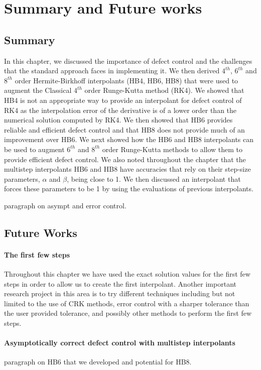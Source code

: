 \section{Summary and Future works}
\subsection{Summary}
In this chapter, we discussed the importance of defect control and the challenges that the standard approach faces in implementing it. We then derived $4^{th}$, $6^{th}$ and $8^{th}$ order Hermite-Birkhoff interpolants (HB4, HB6, HB8) that were used to augment the Classical $4^{th}$ order Runge-Kutta method (RK4). We showed that HB4 is not an appropriate way to provide an interpolant for defect control of RK4 as the interpolation error of the derivative is of a lower order than the numerical solution computed by RK4. We then showed that HB6 provides reliable and efficient defect control and that HB8 does not provide much of an improvement over HB6. We next showed how the HB6 and HB8 interpolants can be used to augment $6^{th}$ and $8^{th}$ order Runge-Kutta methods to allow them to provide efficient defect control. We also noted throughout the chapter that the multistep interpolants HB6 and HB8 have accuracies that rely on their step-size parameters, $\alpha$ and $\beta$, being close to 1. We then discussed an interpolant that forces these parameters to be 1 by using the evaluations of previous interpolants.

paragraph on asympt and error control.

\subsection{Future Works}
\label{section:HB_future_work}

\paragraph{The first few steps}
Throughout this chapter we have used the exact solution values for the first few steps in order to allow us to create the first interpolant. Another important research project in this area is to try different techniques including but not limited to the use of CRK methods, error control with a sharper tolerance than the user provided tolerance, and possibly other methods to perform the first few steps.

\paragraph{Asymptotically correct defect control with multistep interpolants}
paragraph on HB6 that we developed and potential for HB8.

